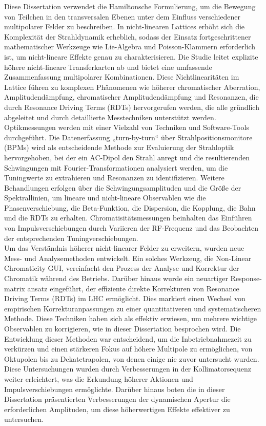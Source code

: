 {%
Diese Dissertation verwendet die Hamiltonsche Formulierung, um die Bewegung von Teilchen in den transversalen Ebenen unter dem Einfluss verschiedener multipolarer Felder zu beschreiben. In nicht-linearen Lattices erhöht sich die Komplexität der Strahldynamik erheblich, sodass der Einsatz fortgeschrittener mathematischer Werkzeuge wie Lie-Algebra und Poisson-Klammern erforderlich ist, um nicht-lineare Effekte genau zu charakterisieren. Die Studie leitet explizite höhere nicht-lineare Transferkarten ab und bietet eine umfassende Zusammenfassung multipolarer Kombinationen. Diese Nichtlinearitäten im Lattice führen zu komplexen Phänomenen wie höherer chromatischer Aberration, Amplitudendämpfung, chromatischer Amplitudendämpfung und Resonanzen, die durch Resonance Driving Terms (RDTs) hervorgerufen werden, die alle gründlich abgeleitet und durch detaillierte Messtechniken unterstützt werden.
\\
\indent
Optikmessungen werden mit einer Vielzahl von Techniken und Software-Tools durchgeführt. Die Datenerfassung „turn-by-turn“ über Strahlpositionsmonitore (BPMs) wird als entscheidende Methode zur Evaluierung der Strahloptik hervorgehoben, bei der ein AC-Dipol den Strahl anregt und die resultierenden Schwingungen mit Fourier-Transformationen analysiert werden, um die Tuningwerte zu extrahieren und Resonanzen zu identifizieren. Weitere Behandlungen erfolgen über die Schwingungsamplituden und die Größe der Spektrallinien, um lineare und nicht-lineare Observablen wie die Phasenverschiebung, die Beta-Funktion, die Dispersion, die Kopplung, die Bahn und die RDTs zu erhalten. Chromatisitätsmessungen beinhalten das Einführen von Impulsverschiebungen durch Variieren der RF-Frequenz und das Beobachten der entsprechenden Tuningverschiebungen.
\\
\indent
Um das Verständnis höherer nicht-linearer Felder zu erweitern, wurden neue Mess- und Analysemethoden entwickelt. Ein solches Werkzeug, die Non-Linear Chromaticity GUI, vereinfacht den Prozess der Analyse und Korrektur der Chromatik während des Betriebs. Darüber hinaus wurde ein neuartiger Response-matrix ansatz eingeführt, der effiziente direkte Korrekturen von Resonance Driving Terms (RDTs) im LHC ermöglicht. Dies markiert einen Wechsel von empirischen Korrekturanpassungen zu einer quantitativeren und systematischeren Methode. Diese Techniken haben sich als effektiv erwiesen, um mehrere wichtige Observablen zu korrigieren, wie in dieser Dissertation besprochen wird. Die Entwicklung dieser Methoden war entscheidend, um die Inbetriebnahmezeit zu verkürzen und einen stärkeren Fokus auf höhere Multipole zu ermöglichen, von Oktupolen bis zu Dekatetrapolen, von denen einige nie zuvor untersucht wurden. Diese Untersuchungen wurden durch Verbesserungen in der Kollimatorsequenz weiter erleichtert, was die Erkundung höherer Aktionen und Impulsverschiebungen ermöglichte. Darüber hinaus boten die in dieser Dissertation präsentierten Verbesserungen der dynamischen Apertur die erforderlichen Amplituden, um diese höherwertigen Effekte effektiver zu untersuchen.

}
